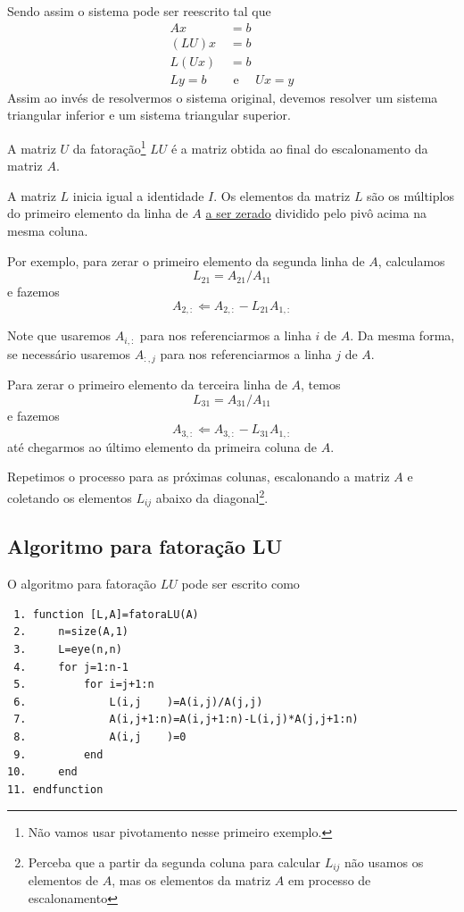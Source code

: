 Sendo assim o sistema pode ser reescrito tal que
\begin{align}
  Ax &=b \\
  (LU)x &=b \\
  L(Ux) &=b \\
  L y = b \quad & \text{ e } \quad Ux=y
\end{align}
Assim ao invés de resolvermos o sistema original, devemos resolver um sistema triangular inferior e um sistema triangular superior.

A matriz $U$ da fatoração\footnote{Não vamos usar pivotamento nesse primeiro exemplo.} $LU$ é a matriz obtida ao final do escalonamento da matriz $A$.

A matriz $L$ inicia igual a identidade $I$. Os elementos da matriz $L$ são os múltiplos do primeiro elemento da linha de $A$ \underline{a ser zerado} dividido pelo pivô acima na mesma coluna.

Por exemplo, para zerar o primeiro elemento da segunda linha de $A$, calculamos
$$L_{21}=A_{21}/A_{11}$$
e fazemos 
$$A_{2,:} \Leftarrow A_{2,:} - L_{21}A_{1,:}$$

Note que usaremos $A_{i,:}$ para nos referenciarmos a linha $i$ de $A$. Da mesma forma, se necessário usaremos $A_{:,j}$ para nos referenciarmos a linha $j$ de $A$.

Para zerar o primeiro elemento da terceira linha de $A$, temos
$$L_{31}=A_{31}/A_{11}$$
e fazemos 
$$A_{3,:} \Leftarrow A_{3,:} - L_{31}A_{1,:}$$
até chegarmos ao último elemento da primeira coluna de $A$.

Repetimos o processo para as próximas colunas, escalonando a matriz $A$ e coletando os elementos $L_{ij}$ abaixo da diagonal\footnote{Perceba que a partir da segunda coluna para calcular $L_{ij}$ não usamos os elementos de $A$, mas os elementos da matriz $A$ em processo de escalonamento}.





\subsection{Algoritmo para fatoração LU}
O algoritmo para fatoração $LU$ pode ser escrito como
\begin{verbatim}
 1. function [L,A]=fatoraLU(A)
 2.     n=size(A,1)
 3.     L=eye(n,n)
 4.     for j=1:n-1
 5.         for i=j+1:n
 6.             L(i,j    )=A(i,j)/A(j,j)
 7.             A(i,j+1:n)=A(i,j+1:n)-L(i,j)*A(j,j+1:n)
 8.             A(i,j    )=0
 9.         end
10.     end
11. endfunction
\end{verbatim}

